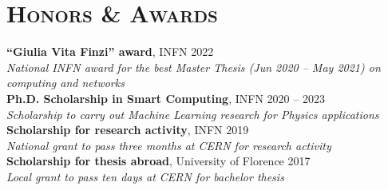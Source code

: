 \newcommand{\scholarship}[4]
  {\normalsize \textbf{\color{maincolor} #1},
  {\color{hlcolor-1} #2} \hfill {\color{hlcolor-2} #3}\\
  {\color{iconcolor} \faMedal} \emph{\color{maincolor} #4}}


\section*{\textsc{Honors \& Awards}}
\begin{cvcontent}
  \scholarship{``Giulia Vita Finzi'' award}{INFN}{2022}{National INFN award for the best Master Thesis (Jun 2020 -- May 2021) on computing and networks}
  \\ [3mm]
  \scholarship{Ph.D. Scholarship in Smart Computing}{INFN}{2020 -- 2023}{Scholarship to carry out Machine Learning research for Physics applications}
  \\ [3mm]
  \scholarship{Scholarship for research activity}{INFN}{2019}{National grant to pass three months at CERN for research activity}
  \\ [3mm]
  \scholarship{Scholarship for thesis abroad}{University of Florence}{2017}{Local grant to pass ten days at CERN for bachelor thesis}
\end{cvcontent}